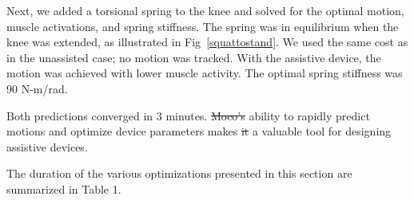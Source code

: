 \documentclass[10pt,letterpaper]{article}
\providecommand{\DIFaddtex}[1]{{\protect\color{blue}\uwave{#1}}} %
\providecommand{\DIFdeltex}[1]{{\protect\color{red}\sout{#1}}}                      %
\providecommand{\DIFaddbegin}{} %
\providecommand{\DIFaddend}{} %
\providecommand{\DIFdelbegin}{} %
\providecommand{\DIFdelend}{} %
\providecommand{\DIFadd}[1]{\texorpdfstring{\DIFaddtex{#1}}{#1}} %
\providecommand{\DIFdel}[1]{\texorpdfstring{\DIFdeltex{#1}}{}} %
\newcommand{\DIFscaledelfig}{0.5}
\newlength{\DIFdelgraphicswidth} %
\newlength{\DIFdelgraphicsheight} %
\newcommand{\DIFaddincludegraphics}[2][]{{\color{blue}\fbox{\DIFOincludegraphics[#1]{#2}}}} %
\newcommand{\DIFdelincludegraphics}[2][]{%
\sbox{\DIFdelgraphicsbox}{\DIFOincludegraphics[#1]{#2}}%
\settoboxwidth{\DIFdelgraphicswidth}{\DIFdelgraphicsbox} %
\settoboxtotalheight{\DIFdelgraphicsheight}{\DIFdelgraphicsbox} %
\scalebox{\DIFscaledelfig}{%
\parbox[b]{\DIFdelgraphicswidth}{\usebox{\DIFdelgraphicsbox}\\[-\baselineskip] \rule{\DIFdelgraphicswidth}{0em}}\llap{\resizebox{\DIFdelgraphicswidth}{\DIFdelgraphicsheight}{%
\setlength{\unitlength}{\DIFdelgraphicswidth}%
\begin{picture}(1,1)%
\thicklines\linethickness{2pt} %
{\color[rgb]{1,0,0}\put(0,0){\framebox(1,1){}}}%
{\color[rgb]{1,0,0}\put(0,0){\line( 1,1){1}}}%
{\color[rgb]{1,0,0}\put(0,1){\line(1,-1){1}}}%
\end{picture}%
}\hspace*{3pt}}} %
} %
\DeclareRobustCommand{\DIFaddbegin}{\DIFOaddbegin \let\includegraphics\DIFaddincludegraphics} %
\DeclareRobustCommand{\DIFaddend}{\DIFOaddend \let\includegraphics\DIFOincludegraphics} %
\DeclareRobustCommand{\DIFdelbegin}{\DIFOdelbegin \let\includegraphics\DIFdelincludegraphics} %
\DeclareRobustCommand{\DIFdelend}{\DIFOaddend \let\includegraphics\DIFOincludegraphics} %
\begin{document}
Next, we added a torsional spring to the knee and solved for the optimal motion, muscle activations, and spring stiffness. The spring was in equilibrium when the knee was extended, as illustrated in Fig~\ref{squattostand}. We used the same cost as in the unassisted case; no motion was tracked. With the assistive device, the motion was achieved with lower muscle activity. The optimal spring stiffness was 90 N-m/rad.

Both predictions converged in 3 minutes. \DIFdelbegin \DIFdel{Moco's }\DIFdelend \DIFaddbegin \DIFadd{The }\DIFaddend ability to rapidly predict motions and optimize device parameters makes \DIFdelbegin \DIFdel{it }\DIFdelend \DIFaddbegin \DIFadd{Moco }\DIFaddend a valuable tool for designing assistive devices.

The duration of the various optimizations presented in this section are summarized in Table 1.
\end{document}

